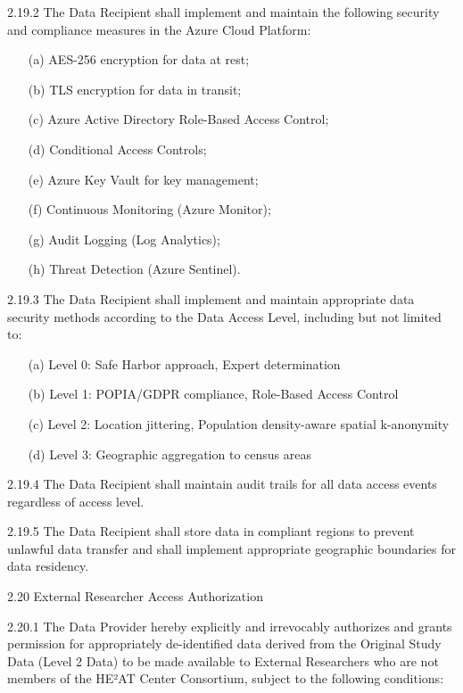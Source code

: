 \documentclass[12pt,letterpaper]{article}
\newcommand{\added}[1]{\textcolor{addcolor}{#1}}
\begin{document}
\added{2.19.2 The Data Recipient shall implement and maintain the following security and compliance measures in the Azure Cloud Platform:
\begin{enumerate}
\item[(a)] AES-256 encryption for data at rest;
\item[(b)] TLS encryption for data in transit;
\item[(c)] Azure Active Directory Role-Based Access Control;
\item[(d)] Conditional Access Controls;
\item[(e)] Azure Key Vault for key management;
\item[(f)] Continuous Monitoring (Azure Monitor);
\item[(g)] Audit Logging (Log Analytics);
\item[(h)] Threat Detection (Azure Sentinel).
\end{enumerate}}

\added{2.19.3 The Data Recipient shall implement and maintain appropriate data security methods according to the Data Access Level, including but not limited to:
\begin{enumerate}
\item[(a)] Level 0: Safe Harbor approach, Expert determination
\item[(b)] Level 1: POPIA/GDPR compliance, Role-Based Access Control
\item[(c)] Level 2: Location jittering, Population density-aware spatial k-anonymity
\item[(d)] Level 3: Geographic aggregation to census areas
\end{enumerate}}

\added{2.19.4 The Data Recipient shall maintain audit trails for all data access events regardless of access level.}

\added{2.19.5 The Data Recipient shall store data in compliant regions to prevent unlawful data transfer and shall implement appropriate geographic boundaries for data residency.}

\added{2.20 External Researcher Access Authorization}

\added{2.20.1 The Data Provider hereby explicitly and irrevocably authorizes and grants permission for appropriately de-identified data derived from the Original Study Data (Level 2 Data) to be made available to External Researchers who are not members of the HE²AT Center Consortium, subject to the following conditions:}
\end{document}
